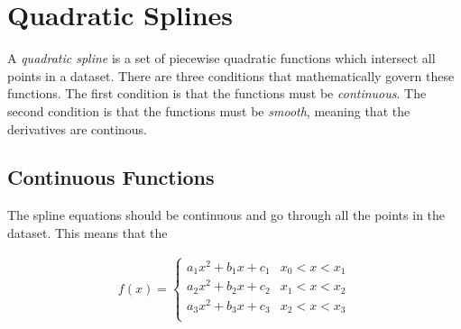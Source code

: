 \section{Quadratic Splines}

A \textit{quadratic spline} is a set of piecewise quadratic functions which intersect all points in a dataset. There are three conditions that mathematically govern these functions. The first condition is that the functions must be \textit{continuous}. The second condition is that the functions must be \textit{smooth}, meaning that the derivatives are continous.

\begin{center}
\end{center}

\subsection{Continuous Functions}
The spline equations should be continuous and go through all the points in the dataset. This means that the 

\begin{align}
f(x)
=
\begin{cases}
a_1x^2 + b_1x + c_1 & x_0 < x < x_1\\
a_2x^2 + b_2x + c_2 & x_1 < x < x_2\\
a_3x^2 + b_3x + c_3 & x_2 < x < x_3\\
\end{cases}
\end{align}


